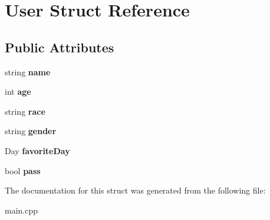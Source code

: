 \hypertarget{struct_user}{\section{User Struct Reference}
\label{struct_user}
}
\subsection*{Public Attributes}
\begin{DoxyCompactItemize}
\item 
\hypertarget{struct_user_a643f85779a4693855c171c396f49e515}{string {\bfseries name}}\label{struct_user_a643f85779a4693855c171c396f49e515}

\item 
\hypertarget{struct_user_aa5829689588d1f982e1a69b73bd68655}{int {\bfseries age}}\label{struct_user_aa5829689588d1f982e1a69b73bd68655}

\item 
\hypertarget{struct_user_abffed56e4aa12d18466d6afc0c33be92}{string {\bfseries race}}\label{struct_user_abffed56e4aa12d18466d6afc0c33be92}

\item 
\hypertarget{struct_user_ac6d672a782dd5e58dd015b1c162eaf56}{string {\bfseries gender}}\label{struct_user_ac6d672a782dd5e58dd015b1c162eaf56}

\item 
\hypertarget{struct_user_ae83ced5dcd5903bf1851db48df97c179}{Day {\bfseries favorite\+Day}}\label{struct_user_ae83ced5dcd5903bf1851db48df97c179}

\item 
\hypertarget{struct_user_aa87d6def0ea86de58f7badf9512935c3}{bool {\bfseries pass}}\label{struct_user_aa87d6def0ea86de58f7badf9512935c3}

\end{DoxyCompactItemize}


The documentation for this struct was generated from the following file\+:\begin{DoxyCompactItemize}
\item 
main.\+cpp\end{DoxyCompactItemize}
